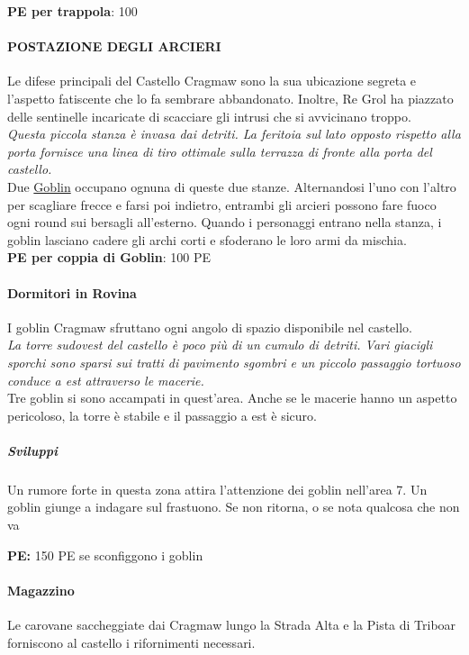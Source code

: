 \documentclass{article}
\begin{document}
\textbf{PE per trappola}: 100

\paragraph{POSTAZIONE DEGLI ARCIERI} Le difese principali del Castello Cragmaw sono la sua
ubicazione segreta e l'aspetto fatiscente che lo fa sembrare
abbandonato. Inoltre, Re Grol ha piazzato delle sentinelle
incaricate di scacciare gli intrusi che si avvicinano troppo.\\

\textit{Questa piccola stanza è invasa dai detriti. La feritoia sul lato
opposto rispetto alla porta fornisce una linea di tiro ottimale
sulla terrazza di fronte alla porta del castello.}\\

Due \hyperlink{goblin}{Goblin} occupano ognuna di queste due stanze.
Alternandosi l'uno con l'altro per scagliare frecce e farsi poi
indietro, entrambi gli arcieri possono fare fuoco ogni round sui bersagli all’esterno. Quando i personaggi entrano nella
stanza, i goblin lasciano cadere gli archi corti e sfoderano le
loro armi da mischia.\\


\textbf{PE per coppia di Goblin}: 100 PE

\paragraph{ Dormitori in Rovina} I goblin Cragmaw sfruttano ogni angolo di spazio disponibile
nel castello. \\ 
\textit{La torre sudovest del castello è poco più di un cumulo di detriti.
Vari giacigli sporchi sono sparsi sui tratti di pavimento sgombri
e un piccolo passaggio tortuoso conduce a est attraverso le
macerie.} \\

Tre goblin si sono accampati in quest'area. Anche se le
macerie hanno un aspetto pericoloso, la torre è stabile e il
passaggio a est è sicuro. 

\subparagraph{Sviluppi}
Un rumore forte in questa zona attira l’attenzione dei goblin
nell’area 7. Un goblin giunge a indagare sul frastuono. Se non
ritorna, o se nota qualcosa che non va

\textbf{PE: } 150 PE se sconfiggono i goblin

\paragraph{ Magazzino } 
Le carovane saccheggiate dai Cragmaw lungo la
Strada Alta e la Pista di Triboar forniscono al castello i
rifornimenti necessari.
\end{document}
